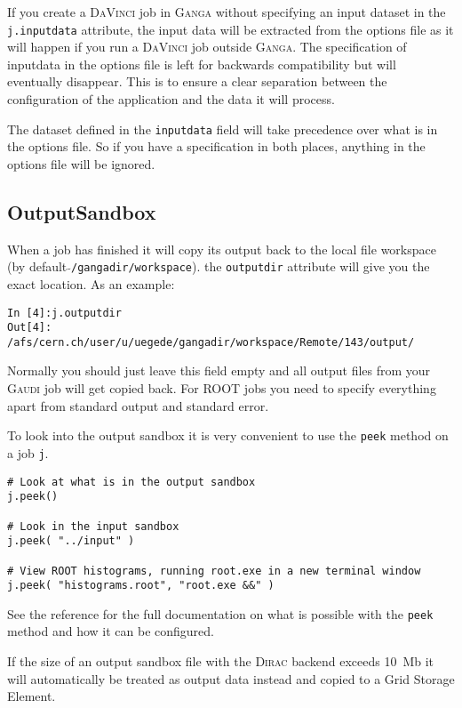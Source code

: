 \documentclass{howto}
\def\ganga {\textsc{Ganga}\xspace}
\def\root {\textsc{ROOT}\xspace}
\def\gaudi {\textsc{Gaudi}\xspace}
\def\davinci {\textsc{DaVinci}\xspace}
\def\dirac {\textsc{Dirac}\xspace}
\begin{document}
If you create a \davinci job in \ganga without specifying an input dataset in
the \texttt{j.inputdata} attribute, the input data will be extracted from the
options file as it will happen if you run a \davinci job outside \ganga. The
specification of inputdata in the options file is left for backwards
compatibility but will eventually disappear. This is to ensure a clear
separation between the configuration of the application and the data it will
process.

\begin{notice}
  The dataset defined in the \texttt{inputdata} field will take precedence
  over what is in the options file. So if you have a specification in both
  places, anything in the options file will be ignored.
\end{notice}

\subsection{OutputSandbox}
\label{sec:OutputSandbox}
When a job has finished it will copy its output back to the local file
workspace (by default \texttt{$\tilde{}$/gangadir/workspace}). the
\texttt{outputdir} attribute will give you the exact location. As an example:
\begin{verbatim}
In [4]:j.outputdir
Out[4]: /afs/cern.ch/user/u/uegede/gangadir/workspace/Remote/143/output/
\end{verbatim}

Normally you should just leave this field empty and all output files from your
\gaudi job will get copied back. For \root jobs you need to specify everything
apart from standard output and standard error.

To look into the output sandbox it is very convenient to use the \texttt{peek}
method on a job \texttt{j}.
\begin{verbatim}
# Look at what is in the output sandbox
j.peek()

# Look in the input sandbox
j.peek( "../input" )

# View ROOT histograms, running root.exe in a new terminal window
j.peek( "histograms.root", "root.exe &&" )
\end{verbatim}

See the reference for the full documentation on what is possible with the
\texttt{peek} method and how it can be configured.

If the size of an output sandbox file with the \dirac backend exceeds 10~Mb it
will automatically be treated as output data instead and copied to a Grid
Storage Element.
\end{document}
